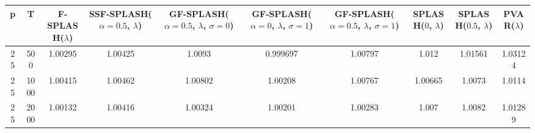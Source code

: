 \begin{tabular}{cccccccccc}
\hline
  p  &  T   &  F-SPLASH($\lambda$)  &  SSF-SPLASH($\alpha=0.5$, $\lambda$)  &  GF-SPLASH($\alpha=0.5$, $\lambda$, $\sigma=0$)  &  GF-SPLASH($\alpha=0$, $\lambda$, $\sigma=1$)  &  GF-SPLASH($\alpha=0.5$, $\lambda$, $\sigma=1$)  &  SPLASH($0$, $\lambda$)  &  SPLASH($0.5$, $\lambda$)  &  PVAR($\lambda$)  \\
\hline
 25  & 500  &        1.00295        &                1.00425                &                      1.0093                      &                    0.999697                    &                     1.00797                      &          1.012           &          1.01561           &      1.03124      \\
 25  & 1000 &        1.00415        &                1.00462                &                     1.00802                      &                    1.00208                     &                     1.00767                      &         1.00665          &           1.0073           &      1.0114       \\
 25  & 2000 &        1.00132        &                1.00416                &                     1.00324                      &                    1.00201                     &                     1.00283                      &          1.007           &           1.0082           &      1.01289      \\
\hline
\end{tabular}